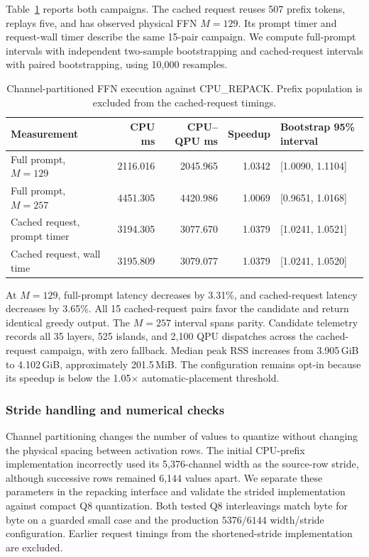 \documentclass[sigplan,screen,review]{acmart}
\begin{document}
Table~\ref{tab:ffn-complete-requests} reports both campaigns. The cached request reuses 507 prefix tokens, replays five, and has observed physical FFN \(M=129\). Its prompt timer and request-wall timer describe the same 15-pair campaign. We compute full-prompt intervals with independent two-sample bootstrapping and cached-request intervals with paired bootstrapping, using 10,000 resamples.

\begin{table}[t]
\centering
\caption{Channel-partitioned FFN execution against CPU\_REPACK. Prefix population is excluded from the cached-request timings.}
\label{tab:ffn-complete-requests}
\small
\begin{tabular}{@{}lrrrl@{}}
\toprule
Measurement & CPU ms & CPU--QPU ms & Speedup & Bootstrap 95\% interval \\
\midrule
Full prompt, $M=129$ & 2116.016 & 2045.965 & 1.0342 & [1.0090, 1.1104] \\
Full prompt, $M=257$ & 4451.305 & 4420.986 & 1.0069 & [0.9651, 1.0168] \\
Cached request, prompt timer & 3194.305 & 3077.670 & 1.0379 & [1.0241, 1.0521] \\
Cached request, wall time & 3195.809 & 3079.077 & 1.0379 & [1.0241, 1.0520] \\
\bottomrule
\end{tabular}
\end{table}

At \(M=129\), full-prompt latency decreases by 3.31\%, and cached-request latency decreases by 3.65\%. All 15 cached-request pairs favor the candidate and return identical greedy output. The \(M=257\) interval spans parity. Candidate telemetry records all 35 layers, 525 islands, and 2,100 QPU dispatches across the cached-request campaign, with zero fallback. Median peak RSS increases from 3.905\,GiB to 4.102\,GiB, approximately 201.5\,MiB. The configuration remains opt-in because its speedup is below the 1.05$\times$ automatic-placement threshold.

\subsubsection{Stride handling and numerical checks}

Channel partitioning changes the number of values to quantize without changing the physical spacing between activation rows. The initial CPU-prefix implementation incorrectly used its 5,376-channel width as the source-row stride, although successive rows remained 6,144 values apart. We separate these parameters in the repacking interface and validate the strided implementation against compact Q8 quantization. Both tested Q8 interleavings match byte for byte on a guarded small case and the production \(5376/6144\) width/stride configuration. Earlier request timings from the shortened-stride implementation are excluded.
\end{document}
